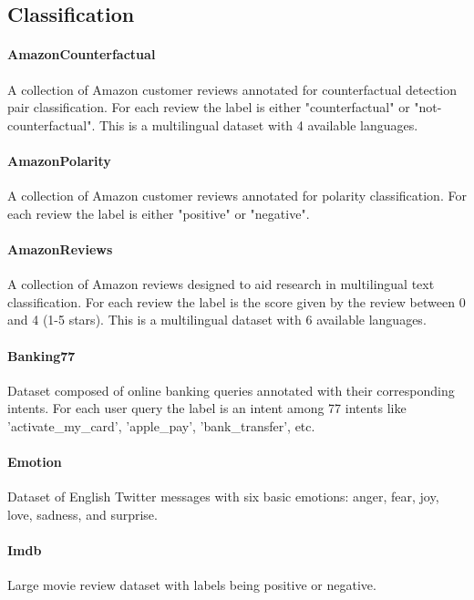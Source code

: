 \documentclass[11pt]{article}
\begin{document}
\subsection{Classification}

\paragraph{AmazonCounterfactual} \cite{oneill2021amazoncounterfactual} A collection of Amazon customer reviews annotated for counterfactual detection pair classification. For each review the label is either "counterfactual" or "not-counterfactual". This is a multilingual dataset with 4 available languages.

\paragraph{AmazonPolarity} \cite{mcauley2013amazon} A collection of Amazon customer reviews annotated for polarity classification. For each review the label is either "positive" or "negative".

\paragraph{AmazonReviews} \cite{mcauley2013amazon} A collection of Amazon reviews designed to aid research in multilingual text classification. For each review the label is the score given by the review between 0 and 4 (1-5 stars). This is a multilingual dataset with 6 available languages.

\paragraph{Banking77} \cite{casanueva2020banking77} Dataset composed of online banking queries annotated with their corresponding intents. For each user query the label is an intent among 77 intents like 'activate\_my\_card', 'apple\_pay', 'bank\_transfer', etc.

\paragraph{Emotion} \cite{saravia2018emotion} Dataset of English Twitter messages with six basic emotions: anger, fear, joy, love, sadness, and surprise.

\paragraph{Imdb} \cite{maas2011imdb} Large movie review dataset with labels being positive or negative.
\end{document}
